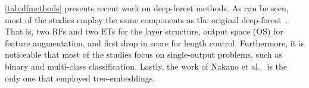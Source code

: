 \documentclass[conference,compsoc]{IEEEtran}
\begin{document}

\autoref{tab:dfmethods} presents recent work on deep-forest methods. As can be seen, most of the studies employ the same components as the original deep-forest~\cite{zhou2019deep}. That is, two RFs and two ETs for the layer structure, output space (OS) for feature augmentation, and first drop in score for length control. Furthermore, it is noticeable that most of the studies focus on single-output problems, such as binary and multi-class classification. Lastly, the work of Nakano et al.~\cite{nakano2022deep} is the only one that employed tree-embeddings.  
\end{document}
